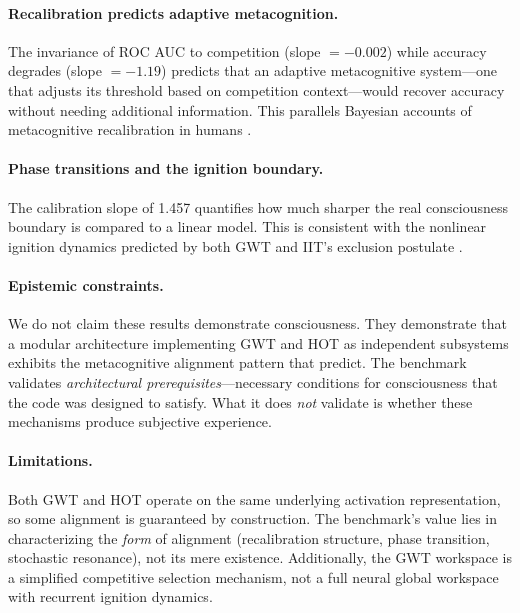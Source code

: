 \documentclass[10pt,letterpaper]{article}
\begin{document}
\paragraph{Recalibration predicts adaptive metacognition.}
The invariance of ROC AUC to competition (slope $= -0.002$) while
accuracy degrades (slope $= -1.19$) predicts that an adaptive
metacognitive system---one that adjusts its threshold based on
competition context---would recover accuracy without needing additional
information.  This parallels Bayesian accounts of metacognitive
recalibration in humans \citep{fleming2017hmeta}.

\paragraph{Phase transitions and the ignition boundary.}
The calibration slope of 1.457 quantifies how much sharper the real
consciousness boundary is compared to a linear model.  This is
consistent with the nonlinear ignition dynamics predicted by both
GWT \citep{dehaene2001towards} and IIT's exclusion postulate
\citep{oizumi2014phenomenology}.

\paragraph{Epistemic constraints.}
We do not claim these results demonstrate consciousness.  They
demonstrate that a modular architecture implementing GWT and HOT as
independent subsystems exhibits the metacognitive alignment pattern
that \citet{lau2011empirical} predict.  The benchmark validates
\emph{architectural prerequisites}---necessary conditions for
consciousness that the code was designed to satisfy.  What it does
\emph{not} validate is whether these mechanisms produce subjective
experience.

\paragraph{Limitations.}
Both GWT and HOT operate on the same underlying activation
representation, so some alignment is guaranteed by construction.
The benchmark's value lies in characterizing the \emph{form} of
alignment (recalibration structure, phase transition, stochastic
resonance), not its mere existence.  Additionally, the GWT workspace
is a simplified competitive selection mechanism, not a full neural
global workspace with recurrent ignition dynamics.


\end{document}
